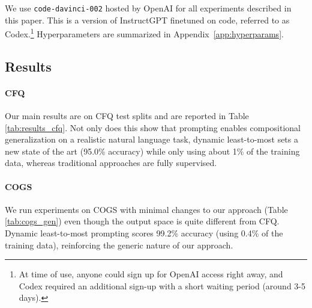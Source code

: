 \documentclass{article} \usepackage{iclr2022_conference,times}
\begin{document}
We use {\small \texttt{code-davinci-002}} hosted by OpenAI for all experiments described in this paper. This is a version of InstructGPT \citep{Ouyang2022TrainingLM} finetuned on code, referred to as Codex.\footnote{At time of use, anyone could sign up for OpenAI access right away, and Codex required an additional sign-up with a short waiting period (around 3-5 days).} 
Hyperparameters are summarized in Appendix~\ref{app:hyperparams}.

\subsection{Results}

\paragraph{CFQ} Our main results are on CFQ test splits and are reported in Table \ref{tab:results_cfq}. Not only does this show that prompting enables compositional generalization on a realistic natural language task, dynamic least-to-most sets a new state of the art (95.0\% accuracy) while only using about 1\% of the training data, whereas traditional approaches are fully supervised. 

\paragraph{COGS} We run experiments on COGS with minimal changes to our approach (Table \ref{tab:cogs_gen}) even though the output space is quite different from CFQ. Dynamic least-to-most prompting scores 99.2\% accuracy (using 0.4\% of the training data), reinforcing the generic nature of our approach.
\end{document}
